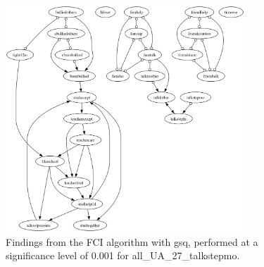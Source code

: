 \begin{figure}[htbp]
    \centering
    \includegraphics[width=0.8\textwidth]{Report/final_report/pictures/FCI_gsq_0.001_all_UA_27_talkstepmo.png}
    \caption{Findings from the FCI algorithm with gsq, performed at a significance level of 0.001 for all_UA_27_talkstepmo.}
    \label{fig:fci_gsq_0.001all_UA_27_talkstepmo}
\end{figure}
